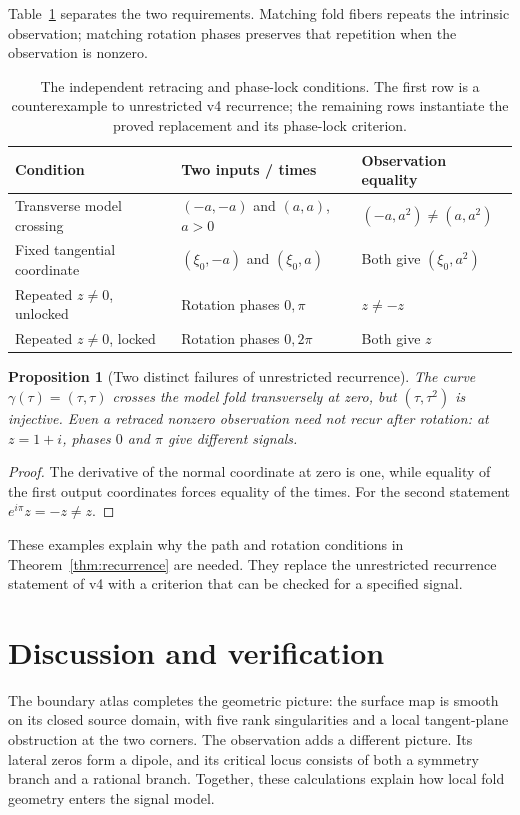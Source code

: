 \documentclass[11pt,a4paper]{article}
\newtheorem{proposition}[theorem]{Proposition}
\theoremstyle{definition}\newtheorem{definition}[theorem]{Definition}
\theoremstyle{remark}\newtheorem{remark}[theorem]{Remark}
\begin{document}
Table~\ref{tab:recurrence} separates the two requirements. Matching
fold fibers repeats the intrinsic observation; matching rotation phases
preserves that repetition when the observation is nonzero.
\begin{table}[!htb]\centering\small
\begin{tabular}{@{}p{.26\linewidth}p{.34\linewidth}p{.32\linewidth}@{}}
\toprule
Condition & Two inputs / times & Observation equality\\
\midrule
Transverse model crossing & $(-a,-a)$ and $(a,a)$, $a>0$ & $(-a,a^2)\ne(a,a^2)$\\
Fixed tangential coordinate & $(\xi_0,-a)$ and $(\xi_0,a)$ & Both give $(\xi_0,a^2)$\\
Repeated $z\ne0$, unlocked & Rotation phases $0,\pi$ & $z\ne-z$\\
Repeated $z\ne0$, locked & Rotation phases $0,2\pi$ & Both give $z$\\
\bottomrule
\end{tabular}
\caption{The independent retracing and phase-lock conditions. The first
row is a counterexample to unrestricted v4 recurrence; the remaining
rows instantiate the proved replacement and its phase-lock criterion.}
\label{tab:recurrence}
\end{table}


\begin{proposition}[Two distinct failures of unrestricted recurrence]\label{prop:counterexamples}
The curve $\gamma(\tau)=(\tau,\tau)$ crosses the model fold transversely
at zero, but $(\tau,\tau^2)$ is injective. Even a retraced nonzero
observation need not recur after rotation: at $z=1+i$, phases $0$ and
$\pi$ give different signals.
\end{proposition}
\begin{proof}
The derivative of the normal coordinate at zero is one, while equality
of the first output coordinates forces equality of the times.
For the second statement $e^{i\pi}z=-z\ne z$.
\end{proof}
These examples explain why the path and rotation conditions in
Theorem~\ref{thm:recurrence} are needed. They replace the unrestricted
recurrence statement of v4 with a criterion that can be checked for a
specified signal.

\section{Discussion and verification}
The boundary atlas completes the geometric picture: the surface map is
smooth on its closed source domain, with five rank singularities and a
local tangent-plane obstruction at the two corners. The observation
adds a different picture. Its lateral zeros form a dipole, and its
critical locus consists of both a symmetry branch and a rational branch.
Together, these calculations explain how local fold geometry enters
the signal model.
\end{document}
